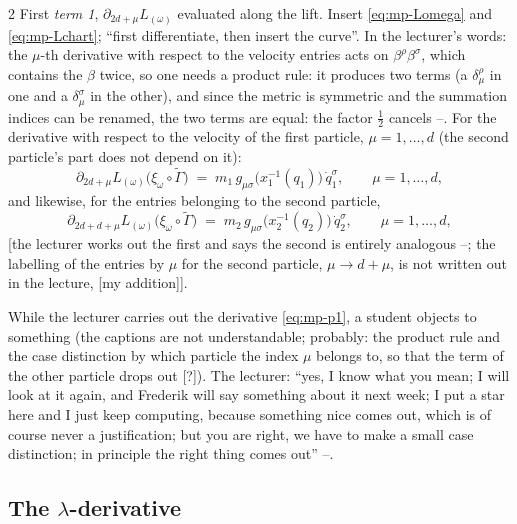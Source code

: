 \begin{paracol}{2}
First \emph{term 1}, $\partial_{2d+\mu}L_{(\omega)}$ evaluated along the lift. Insert \eqref{eq:mp-Lomega} and \eqref{eq:mp-Lchart}; ``first differentiate, then insert the curve''. In the lecturer's words: the $\mu$-th derivative with respect to the velocity entries acts on $\beta^\rho\beta^\sigma$, which contains the $\beta$ twice, so one needs a product rule: it produces two terms (a $\delta^\rho_\mu$ in one and a $\delta^\sigma_\mu$ in the other), and since the metric is symmetric and the summation indices can be renamed, the two terms are equal: the factor $\tfrac12$ cancels --. For the derivative with respect to the velocity of the first particle, $\mu=1,\dots,d$ (the second particle's part does not depend on it):
\begin{equation}\label{eq:mp-p1}
  \partial_{2d+\mu}L_{(\omega)}\bigl(\xi_\omega\circ\tilde\Gamma\bigr)\;=\;m_1\,g_{\mu\sigma}\bigl(x_1^{-1}(q_1)\bigr)\,\dot q_1^{\sigma},\qquad\mu=1,\dots,d,
\end{equation}
and likewise, for the entries belonging to the second particle,
\begin{equation}\label{eq:mp-p2}
  \partial_{2d+d+\mu}L_{(\omega)}\bigl(\xi_\omega\circ\tilde\Gamma\bigr)\;=\;m_2\,g_{\mu\sigma}\bigl(x_2^{-1}(q_2)\bigr)\,\dot q_2^{\sigma},\qquad\mu=1,\dots,d,
\end{equation}
[the lecturer works out the first and says the second is entirely analogous --; the labelling of the entries by $\mu$ for the second particle, $\mu\to d+\mu$, is not written out in the lecture, [my addition]].

\begin{coursenote}\label{cn:mp-student}
While the lecturer carries out the derivative \eqref{eq:mp-p1}, a student objects to something (the captions are not understandable; probably: the product rule and the case distinction by which particle the index $\mu$ belongs to, so that the term of the other particle drops out [?]). The lecturer: ``yes, I know what you mean; I will look at it again, and Frederik will say something about it next week; I put a star here and I just keep computing, because something nice comes out, which is of course never a justification; but you are right, we have to make a small case distinction; in principle the right thing comes out'' --.
\end{coursenote}

\subsection{The $\lambda$-derivative}\label{ssec:mp-ddl}


\end{paracol}
